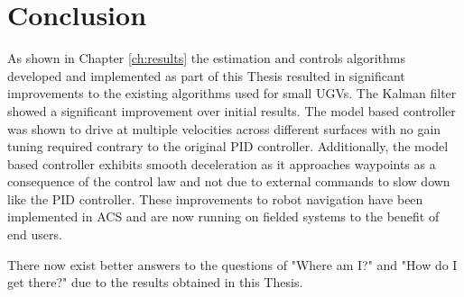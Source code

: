 \chapter{Conclusion}
\label{ch:conclusion}
As shown in Chapter \ref{ch:results} the estimation and controls algorithms developed and implemented as part of this Thesis resulted in significant improvements to the existing algorithms used for small UGVs. The Kalman filter showed a significant improvement over initial results. The model based controller was shown to drive at multiple velocities across different surfaces with no gain tuning required contrary to the original PID controller. Additionally, the model based controller exhibits smooth deceleration as it approaches waypoints as a consequence of the control law and not due to external commands to slow down like the PID controller. These improvements to robot navigation have been implemented in ACS and are now running on fielded systems to the benefit of end users.

There now exist better answers to the questions of "Where am I?" and "How do I get there?" due to the results obtained in this Thesis.
